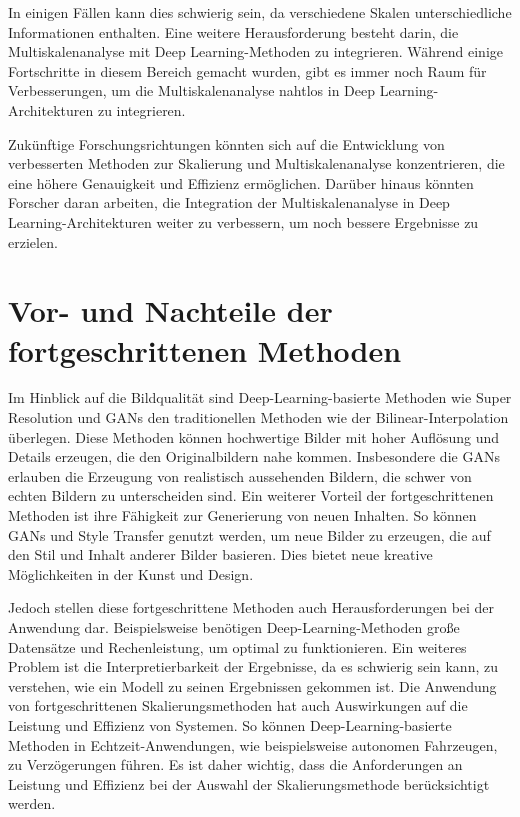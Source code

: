         
        In einigen Fällen kann dies schwierig sein, da verschiedene Skalen unterschiedliche Informationen enthalten.
        Eine weitere Herausforderung besteht darin, die Multiskalenanalyse mit Deep Learning-Methoden zu integrieren.      
        Während einige Fortschritte in diesem Bereich gemacht wurden, gibt es immer noch Raum für Verbesserungen, um die Multiskalenanalyse nahtlos in Deep Learning-Architekturen zu integrieren.
        
        Zukünftige Forschungsrichtungen könnten sich auf die Entwicklung von verbesserten Methoden zur Skalierung und Multiskalenanalyse konzentrieren, die eine höhere Genauigkeit und Effizienz ermöglichen.      
        Darüber hinaus könnten Forscher daran arbeiten, die Integration der Multiskalenanalyse in Deep Learning-Architekturen weiter zu verbessern, um noch bessere Ergebnisse zu erzielen.

\section{Vor- und Nachteile der fortgeschrittenen Methoden}

    Im Hinblick auf die Bildqualität sind Deep-Learning-basierte Methoden wie Super Resolution und GANs den traditionellen Methoden wie der Bilinear-Interpolation überlegen.      
    Diese Methoden können hochwertige Bilder mit hoher Auflösung und Details erzeugen, die den Originalbildern nahe kommen.      
    Insbesondere die GANs erlauben die Erzeugung von realistisch aussehenden Bildern, die schwer von echten Bildern zu unterscheiden sind.
    Ein weiterer Vorteil der fortgeschrittenen Methoden ist ihre Fähigkeit zur Generierung von neuen Inhalten.   
    So können GANs und Style Transfer genutzt werden, um neue Bilder zu erzeugen, die auf den Stil und Inhalt anderer Bilder basieren.      
    Dies bietet neue kreative Möglichkeiten in der Kunst und Design.

    Jedoch stellen diese fortgeschrittene Methoden auch Herausforderungen bei der Anwendung dar.      
    Beispielsweise benötigen Deep-Learning-Methoden große Datensätze und Rechenleistung, um optimal zu funktionieren.      
    Ein weiteres Problem ist die Interpretierbarkeit der Ergebnisse, da es schwierig sein kann, zu verstehen, wie ein Modell zu seinen Ergebnissen gekommen ist.
    Die Anwendung von fortgeschrittenen Skalierungsmethoden hat auch Auswirkungen auf die Leistung und Effizienz von Systemen.      
    So können Deep-Learning-basierte Methoden in Echtzeit-Anwendungen, wie beispielsweise autonomen Fahrzeugen, zu Verzögerungen führen.      
    Es ist daher wichtig, dass die Anforderungen an Leistung und Effizienz bei der Auswahl der Skalierungsmethode berücksichtigt werden.
    
